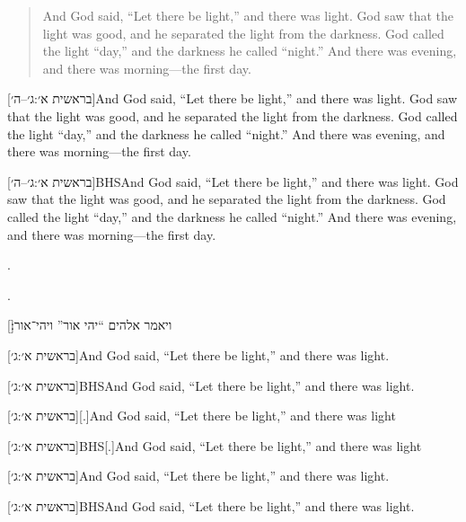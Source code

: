 \documentclass[12pt]{article}
\begin{document}
\hyphenblockcquote{english}[בראשית א׳:ג׳–ה׳]{BHS}{And God said, \enquote{Let
there be light,} and there was light. God saw that the light was good, and he
separated the light from the darkness. God called the light \enquote{day,} and
the darkness he called \enquote{night.} And there was evening, and there was
morning—the first day.}

[בראשית א׳:ג׳–ה׳]{And God said, \enquote{Let there
be light,} and there was light. God saw that the light was good, and he
separated the light from the darkness. God called the light \enquote{day,} and
the darkness he called \enquote{night.} And there was evening, and there was
morning—the first day.}

[בראשית א׳:ג׳–ה׳]{BHS}{And God said, \enquote{Let
there be light,} and there was light. God saw that the light was good, and he
separated the light from the darkness. God called the light \enquote{day,} and
the darkness he called \enquote{night.} And there was evening, and there was
morning—the first day.}

.

.


[׃]{ויאמר אלהים \enquote{יהי אור} ויהי־אור}



[בראשית א׳:ג׳]{And God said, \enquote{Let there be
light,} and there was light}.

[בראשית א׳:ג׳]{BHS}{And God said, \enquote{Let
there be light,} and there was light}.

[בראשית א׳:ג׳][.]{And God said, \enquote{Let there
be light,} and there was light}

[בראשית א׳:ג׳]{BHS}[.]{And God said, \enquote{Let
there be light,} and there was light}

[בראשית א׳:ג׳]{And God said, \enquote{Let there be
light,} and there was light.}

[בראשית א׳:ג׳]{BHS}{And God said, \enquote{Let
there be light,} and there was light.}
\end{document}
